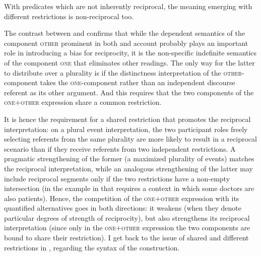 \documentclass[output=paper,colorlinks,citecolor=brown]{langscibook}
\begin{document}
\noindent With predicates which are not inherently reciprocal, the meaning emerging with different restrictions is non-reciprocal too.

\ea\label{ex:arsenijevic:Lekari}
\label{ex:arsenijevic:Lekari-a}
\label{ex:arsenijevic:Lekari-b}
\label{ex:arsenijevic:Lekari-c}
 \z \z
 
\noindent The contrast between  and  confirms that while the dependent semantics of the component \textsc{other} prominent in both  and  account probably plays an important role in introducing a bias for reciprocity, it is the non-specific indefinite semantics of the component \textsc{one} that eliminates other readings. The only way for the latter to distribute over a plurality is if the distinctness interpretation of the \textsc{other}-component takes the \textsc{one}-component rather than an independent discourse referent as its other argument. And this requires that the two components of the \textsc{one$+$other} expression share a common restriction.

It is hence the requirement for a shared restriction that promotes the reciprocal interpretation: on a plural event interpretation, the two participant roles freely selecting referents from the same plurality are more likely to result in a reciprocal scenario than if they receive referents from two independent restrictions. A pragmatic strengthening of the former (a maximized plurality of events) matches the reciprocal interpretation, while an analogous strengthening of the latter may include reciprocal segments only if the two restrictions have a non-empty intersection (in the example in  that requires a context in which some doctors are also patients). Hence, the competition of the \textsc{one$+$other} expression with its quantified alternatives goes in both directions: it weakens (when they denote particular degrees of strength of reciprocity), but also strengthens its reciprocal interpretation (since only in the \textsc{one$+$other} expression the two components are bound to share their restriction). I get back to the issue of shared and different restrictions in , regarding the syntax of the construction.
\end{document}
